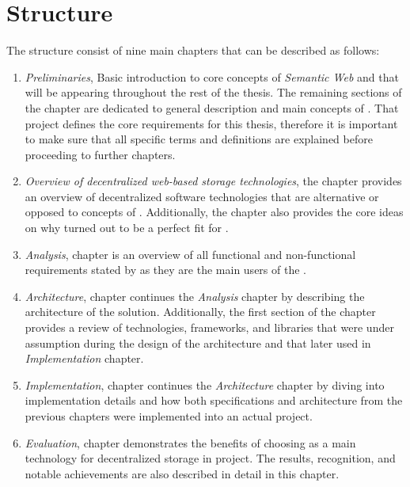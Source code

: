 \section*{Structure}

The structure consist of nine main chapters that can be described as follows:
\begin{enumerate}
    \item \textit{Preliminaries}, Basic introduction to core concepts of \textit{Semantic Web} and \solid{} that will be appearing throughout the rest of the thesis. The remaining sections of the chapter are dedicated to general description and main concepts of \lpa{}. That project defines the core requirements for this thesis, therefore it is important to make sure that all \lpa{} specific terms and definitions are explained before proceeding to further chapters.
    
    \item \textit{Overview of decentralized web-based storage technologies}, the chapter provides an overview of decentralized software technologies that are alternative or opposed to concepts of \solid{}. Additionally, the chapter also provides the core ideas on why \solid{} turned out to be a perfect fit for \lpa{}.

    \item \textit{Analysis}, chapter is an overview of all functional and non-functional requirements stated by \lpa{} as they are the main users of the \lpas{}.

    \item \textit{Architecture}, chapter continues the \textit{Analysis} chapter by describing the architecture of the solution. Additionally, the first section of the chapter provides a review of technologies, frameworks, and libraries that were under assumption during the design of the architecture and that later used in \textit{Implementation} chapter.  

    \item \textit{Implementation}, chapter continues the \textit{Architecture} chapter by diving into implementation details and how both specifications and architecture from the previous chapters were implemented into an actual project. 
    
    \item \textit{Evaluation}, chapter demonstrates the benefits of choosing \solid{} as a main technology for decentralized storage in \lpa{} project. The results, recognition, and notable achievements are also described in detail in this chapter.
    

\end{enumerate}
